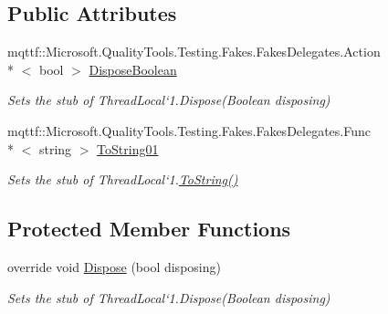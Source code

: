 \subsection*{Public Attributes}
\begin{DoxyCompactItemize}
\item 
mqttf\-::\-Microsoft.\-Quality\-Tools.\-Testing.\-Fakes.\-Fakes\-Delegates.\-Action\\*
$<$ bool $>$ \hyperlink{class_system_1_1_threading_1_1_fakes_1_1_stub_thread_local_3_01_t_01_4_a0bba93f88e6f31afea819bf5f9dbe1f2}{Dispose\-Boolean}
\begin{DoxyCompactList}\small\item\em Sets the stub of Thread\-Local`1.Dispose(\-Boolean disposing)\end{DoxyCompactList}\item 
mqttf\-::\-Microsoft.\-Quality\-Tools.\-Testing.\-Fakes.\-Fakes\-Delegates.\-Func\\*
$<$ string $>$ \hyperlink{class_system_1_1_threading_1_1_fakes_1_1_stub_thread_local_3_01_t_01_4_a9b800c2e81680323d1f13df5021743a7}{To\-String01}
\begin{DoxyCompactList}\small\item\em Sets the stub of Thread\-Local`1.\hyperlink{class_system_1_1_threading_1_1_fakes_1_1_stub_thread_local_3_01_t_01_4_ab08763e3a8a424b5e591eebac2ed842a}{To\-String()}\end{DoxyCompactList}\end{DoxyCompactItemize}
\subsection*{Protected Member Functions}
\begin{DoxyCompactItemize}
\item 
override void \hyperlink{class_system_1_1_threading_1_1_fakes_1_1_stub_thread_local_3_01_t_01_4_a86b2af343eff2c4d678e446f7e02be75}{Dispose} (bool disposing)
\begin{DoxyCompactList}\small\item\em Sets the stub of Thread\-Local`1.Dispose(\-Boolean disposing)\end{DoxyCompactList}\end{DoxyCompactItemize}
